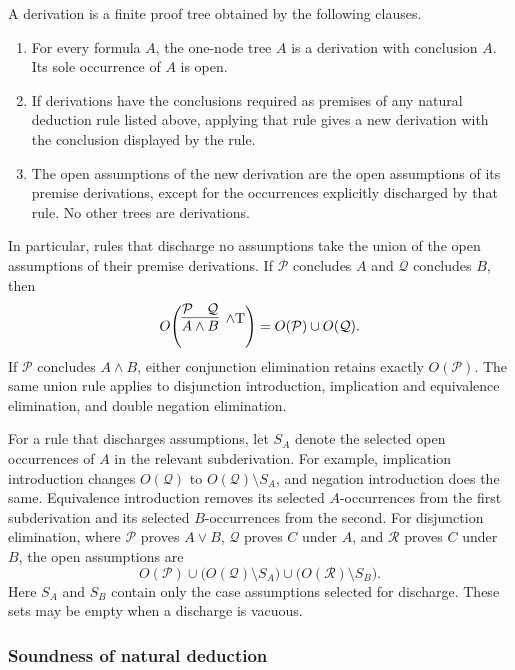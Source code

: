 \documentclass[11pt,a4paper]{amsart}
\begin{document}
\begin{definition}
  A derivation is a finite proof tree obtained by the following clauses.
  \begin{enumerate}
    \item For every formula \(A\), the one-node tree \(A\) is a derivation
      with conclusion \(A\). Its sole occurrence of \(A\) is open.
    \item If derivations have the conclusions required as premises of any
      natural deduction rule listed above, applying that rule gives a new
      derivation with the conclusion displayed by the rule.
    \item The open assumptions of the new derivation are the open
      assumptions of its premise derivations, except for the occurrences
      explicitly discharged by that rule. No other trees are derivations.
  \end{enumerate}
\end{definition}

In particular, rules that discharge no assumptions take the union of the
open assumptions of their premise derivations. If \(\mathcal P\) concludes
\(A\) and \(\mathcal Q\) concludes \(B\), then
\[
  O\!\left(\infer[\land\mathrm T]{A\land B}{\mathcal P & \mathcal Q}\right)
  =O(\mathcal P)\cup O(\mathcal Q).
\]
If \(\mathcal P\) concludes \(A\land B\), either conjunction elimination
retains exactly \(O(\mathcal P)\). The same union rule applies to disjunction
introduction, implication and equivalence elimination, and double negation
elimination.

For a rule that discharges assumptions, let \(S_A\) denote the selected
open occurrences of \(A\) in the relevant subderivation. For example,
implication introduction changes \(O(\mathcal Q)\) to
\(O(\mathcal Q)\setminus S_A\), and negation introduction does the same.
Equivalence introduction removes its selected \(A\)-occurrences from the
first subderivation and its selected \(B\)-occurrences from the second.
For disjunction elimination, where \(\mathcal P\) proves \(A\lor B\),
\(\mathcal Q\) proves \(C\) under \(A\), and \(\mathcal R\) proves \(C\)
under \(B\), the open assumptions are
\[
  O(\mathcal P)\cup
  \bigl(O(\mathcal Q)\setminus S_A\bigr)\cup
  \bigl(O(\mathcal R)\setminus S_B\bigr).
\]
Here \(S_A\) and \(S_B\) contain only the case assumptions selected for
discharge. These sets may be empty when a discharge is vacuous.

\subsubsection{Soundness of natural deduction}
\end{document}
